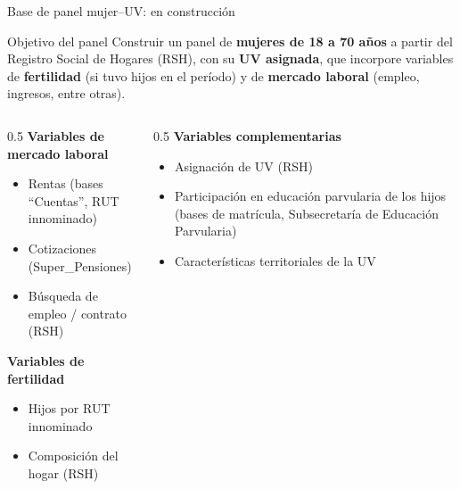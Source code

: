 \documentclass[aspectratio=169,10pt]{beamer}
\begin{document}
\begin{frame}{Base de panel mujer--UV: en construcción}
\begin{block}{Objetivo del panel}
\footnotesize Construir un panel de \textbf{mujeres de 18 a 70 años} a partir del Registro Social de Hogares (RSH), con su \textbf{UV asignada}, que incorpore variables de \textbf{fertilidad} (si tuvo hijos en el período) y de \textbf{mercado laboral} (empleo, ingresos, entre otras).
\end{block}
\vspace{4pt}
\begingroup
{}
\begin{columns}[T]
\begin{column}{0.5\textwidth}
{\footnotesize\textbf{Variables de mercado laboral}}
\begin{itemize}
  \footnotesize
  \item Rentas (bases ``Cuentas'', RUT innominado)
  \item Cotizaciones (Super\_Pensiones)
  \item Búsqueda de empleo / contrato (RSH)
\end{itemize}
\vspace{4pt}
{\footnotesize\textbf{Variables de fertilidad}}
\begin{itemize}
  \footnotesize
  \item Hijos por RUT innominado
  \item Composición del hogar (RSH)
\end{itemize}
\end{column}
\begin{column}{0.5\textwidth}
{\footnotesize\textbf{Variables complementarias}}
\begin{itemize}
  \footnotesize
  \item Asignación de UV (RSH)
  \item Participación en educación parvularia de los hijos (bases de matrícula, Subsecretaría de Educación Parvularia)
  \item Características territoriales de la UV
\end{itemize}
\end{column}
\end{columns}
\endgroup
\end{frame}
\end{document}
